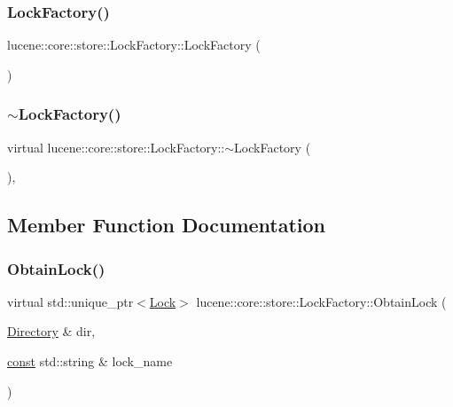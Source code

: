 \subsubsection{\texorpdfstring{Lock\+Factory()}{LockFactory()}}
{\footnotesize\ttfamily lucene\+::core\+::store\+::\+Lock\+Factory\+::\+Lock\+Factory (\begin{DoxyParamCaption}{ }\end{DoxyParamCaption})\hspace{0.3cm}{\ttfamily [default]}}

\mbox{\label{classlucene_1_1core_1_1store_1_1LockFactory_a4b81b04ffd8921a539028d5193121ee5}} 
\subsubsection{\texorpdfstring{$\sim$\+Lock\+Factory()}{~LockFactory()}}
{\footnotesize\ttfamily virtual lucene\+::core\+::store\+::\+Lock\+Factory\+::$\sim$\+Lock\+Factory (\begin{DoxyParamCaption}{ }\end{DoxyParamCaption})\hspace{0.3cm}{\ttfamily [virtual]}, {\ttfamily [default]}}



\subsection{Member Function Documentation}
\mbox{\label{classlucene_1_1core_1_1store_1_1LockFactory_a46f215414ef4714b6dc3298ddbd352f8}} 
\subsubsection{\texorpdfstring{Obtain\+Lock()}{ObtainLock()}}
{\footnotesize\ttfamily virtual std\+::unique\+\_\+ptr$<$\mbox{\hyperlink{classlucene_1_1core_1_1store_1_1Lock}{Lock}}$>$ lucene\+::core\+::store\+::\+Lock\+Factory\+::\+Obtain\+Lock (\begin{DoxyParamCaption}\item[{\mbox{\hyperlink{classlucene_1_1core_1_1store_1_1Directory}{Directory}} \&}]{dir,  }\item[{\mbox{\hyperlink{ZlibCrc32_8h_a2c212835823e3c54a8ab6d95c652660e}{const}} std\+::string \&}]{lock\+\_\+name }\end{DoxyParamCaption})\hspace{0.3cm}{\ttfamily [pure virtual]}}



